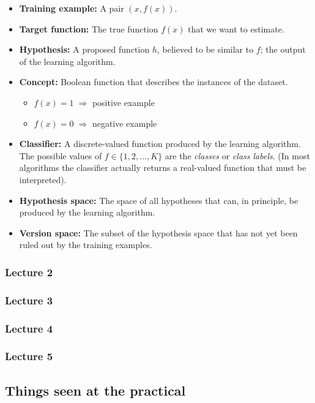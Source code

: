 \begin{itemize}
    \item \textbf{Training example:} A pair $(x, f(x))$.
    \item \textbf{Target function:} The true function $f(x)$ that we want to estimate.
    \item \textbf{Hypothesis:} A proposed function $h$, believed to be similar to $f$; the output of the learning algorithm.
    \item \textbf{Concept:} Boolean function that describes the instances of the dataset.
          \begin{itemize}
              \item $f(x) = 1 \;\Rightarrow$ positive example
              \item $f(x) = 0 \;\Rightarrow$ negative example 
          \end{itemize}
    \item \textbf{Classifier:} A discrete-valued function produced by the learning algorithm.  
          The possible values of $f \in \{1,2,\dots,K\}$ are the \emph{classes} or \emph{class labels}.  
          (In most algorithms the classifier actually returns a real-valued function that must be interpreted).
    \item \textbf{Hypothesis space:} The space of all hypotheses that can, in principle, be produced by the learning algorithm.
    \item \textbf{Version space:} The subset of the hypothesis space that has not yet been ruled out by the training examples.
\end{itemize}


\subsubsection{Lecture 2}
\subsubsection{Lecture 3}
\subsubsection{Lecture 4}
\subsubsection{Lecture 5}

\subsection{Things seen at the practical}


